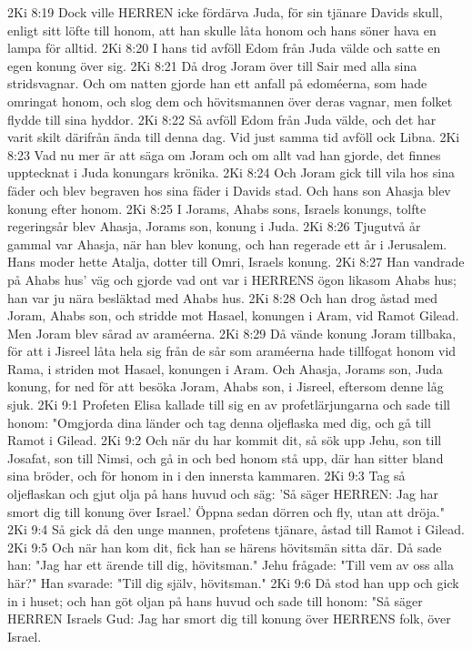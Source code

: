 2Ki 8:19  Dock ville HERREN icke fördärva Juda, för sin tjänare Davids skull, enligt sitt löfte till honom, att han skulle låta honom och hans söner hava en lampa för alltid.
2Ki 8:20  I hans tid avföll Edom från Juda välde och satte en egen konung över sig.
2Ki 8:21  Då drog Joram över till Sair med alla sina stridsvagnar. Och om natten gjorde han ett anfall på edoméerna, som hade omringat honom, och slog dem och hövitsmannen över deras vagnar, men folket flydde till sina hyddor.
2Ki 8:22  Så avföll Edom från Juda välde, och det har varit skilt därifrån ända till denna dag. Vid just samma tid avföll ock Libna.
2Ki 8:23  Vad nu mer är att säga om Joram och om allt vad han gjorde, det finnes upptecknat i Juda konungars krönika.
2Ki 8:24  Och Joram gick till vila hos sina fäder och blev begraven hos sina fäder i Davids stad. Och hans son Ahasja blev konung efter honom.
2Ki 8:25  I Jorams, Ahabs sons, Israels konungs, tolfte regeringsår blev Ahasja, Jorams son, konung i Juda.
2Ki 8:26  Tjugutvå år gammal var Ahasja, när han blev konung, och han regerade ett år i Jerusalem. Hans moder hette Atalja, dotter till Omri, Israels konung.
2Ki 8:27  Han vandrade på Ahabs hus' väg och gjorde vad ont var i HERRENS ögon likasom Ahabs hus; han var ju nära besläktad med Ahabs hus.
2Ki 8:28  Och han drog åstad med Joram, Ahabs son, och stridde mot Hasael, konungen i Aram, vid Ramot Gilead. Men Joram blev sårad av araméerna.
2Ki 8:29  Då vände konung Joram tillbaka, för att i Jisreel låta hela sig från de sår som araméerna hade tillfogat honom vid Rama, i striden mot Hasael, konungen i Aram. Och Ahasja, Jorams son, Juda konung, for ned för att besöka Joram, Ahabs son, i Jisreel, eftersom denne låg sjuk.
2Ki 9:1  Profeten Elisa kallade till sig en av profetlärjungarna och sade till honom: "Omgjorda dina länder och tag denna oljeflaska med dig, och gå till Ramot i Gilead.
2Ki 9:2  Och när du har kommit dit, så sök upp Jehu, son till Josafat, son till Nimsi, och gå in och bed honom stå upp, där han sitter bland sina bröder, och för honom in i den innersta kammaren.
2Ki 9:3  Tag så oljeflaskan och gjut olja på hans huvud och säg: 'Så säger HERREN: Jag har smort dig till konung över Israel.' Öppna sedan dörren och fly, utan att dröja."
2Ki 9:4  Så gick då den unge mannen, profetens tjänare, åstad till Ramot i Gilead.
2Ki 9:5  Och när han kom dit, fick han se härens hövitsmän sitta där. Då sade han: "Jag har ett ärende till dig, hövitsman." Jehu frågade: "Till vem av oss alla här?" Han svarade: "Till dig själv, hövitsman."
2Ki 9:6  Då stod han upp och gick in i huset; och han göt oljan på hans huvud och sade till honom: "Så säger HERREN Israels Gud: Jag har smort dig till konung över HERRENS folk, över Israel.

